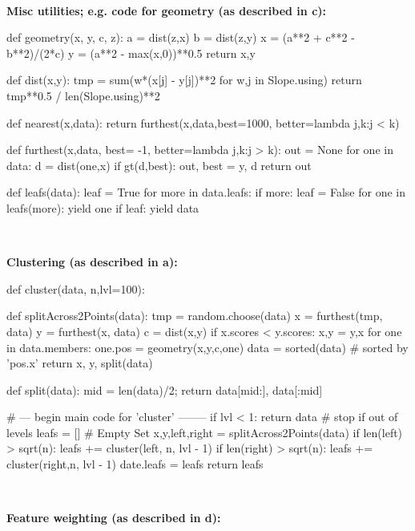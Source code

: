 \begin{figure*}
\begin{minipage}[t]{.45\linewidth}
~~

{\bf Misc utilities; e.g. code for geometry (as described in c):}

 
\begin{python}[left]
def geometry(x, y, c, z): 
  a = dist(z,x)
  b = dist(z,y) 
  x = (a**2 + c**2 - b**2)/(2*c) 
  y = (a**2 - max(x,0))**0.5
  return x,y

def dist(x,y):
   tmp = sum(w*(x[j] - y[j])**2 for w,j in Slope.using) 
   return tmp**0.5 / len(Slope.using)**2
   
def nearest(x,data):
  return furthest(x,data,best=1000,
                    better=lambda j,k:j < k)
 
def furthest(x,data, best= -1, 
                     better=lambda j,k:j > k):  
  out = None
  for one in data:
    d = dist(one,x)
    if gt(d,best): out, best = y, d
  return out

def leafs(data):
  leaf = True
  for more in data.leafs:
    if more:
       leaf = False
       for one in leafs(more):
         yield one
  if leaf: 
    yield data
\end{python}
 \end{minipage}~~~~~~~~~\begin{minipage}[t]{.4\linewidth} 
\scriptsize\vspace{1mm}
{\bf Clustering (as described in a):}
\begin{python}[right]
def cluster(data, n,lvl=100):

  def splitAcross2Points(data): 
    tmp = random.choose(data)
    x = furthest(tmp, data)
    y = furthest(x, data) 
    c = dist(x,y)  
    if x.scores < y.scores:
      x,y = y,x 
    for one in data.members: 
      one.pos = geometry(x,y,c,one)
    data = sorted(data) # sorted by 'pos.x'
    return x, y, split(data)
  
  def split(data):   
    mid = len(data)/2; 
    return data[mid:], data[:mid]
    
  # --- begin main code for  'cluster' --------
  if lvl < 1: 
     return data # stop if out of levels
  leafs = [] # Empty Set
  x,y,left,right = splitAcross2Points(data) 
  if len(left) > sqrt(n):  
     leafs += cluster(left, n, lvl - 1)  
  if len(right) > sqrt(n):
     leafs += cluster(right,n,  lvl - 1) 
  date.leafs = leafs
  return leafs
\end{python} 

~~

{\bf Feature weighting  (as described in d):}


\end{minipage}
\end{figure*}
